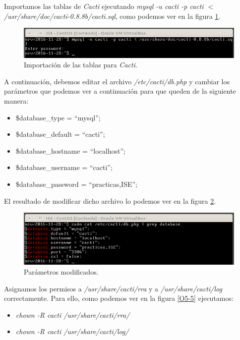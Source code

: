 \documentclass[a4paper,titlepage,12pt]{scrartcl}	%
\numberwithin{figure}{section} %
\numberwithin{table}{section} %
\begin{document}
	Importamos las tablas de \textit{Cacti} ejecutando \textit{mysql -u cacti -p cacti $<$ /usr/share/doc/cacti-0.8.8b/cacti.sql}, como podemos ver en la figura \ref{O5-3}.
	
	\begin{figure}[H]
		\includegraphics[width=\linewidth]{./Imagenes/O5-3.png}
		\vspace{-0.5cm}
		\caption[Importación de las tablas para \textit{Cacti}.]{Importación de las tablas para \textit{Cacti}.}
		\label{O5-3}
	\end{figure}
	
	A continuación, debemos editar el archivo \textit{/etc/cacti/db.php} y cambiar los parámetros que podemos ver a continuación para que queden de la siguiente manera:
	\begin{itemize}
		\item \$database\_type = ``mysql'';
		\item \$database\_default = ``cacti'';
		\item \$database\_hostname = ``localhost'';
		\item \$database\_username = ``cacti'';
		\item \$database\_password = ``practicas,ISE'';
	\end{itemize}
	
	El resultado de modificar dicho archivo lo podemos ver en la figura \ref{O5-4}.
	
	\begin{figure}[H]
		\includegraphics[width=\linewidth]{./Imagenes/O5-4.png}
		\vspace{-0.5cm}
		\caption[Parámetros modificados.]{Parámetros modificados.}
		\label{O5-4}
	\end{figure}
	
	Asignamos los permisos a \textit{/usr/share/cacti/rra} y a \textit{/usr/share/cacti/log} correctamente. Para ello, como podemos ver en la figura \ref{O5-5} ejecutamos:
	\begin{itemize}
		\item \textit{chown -R cacti /usr/share/cacti/rra/}
		\item \textit{chown -R cacti /usr/share/cacti/log/}
	\end{itemize}
	
\end{document}

